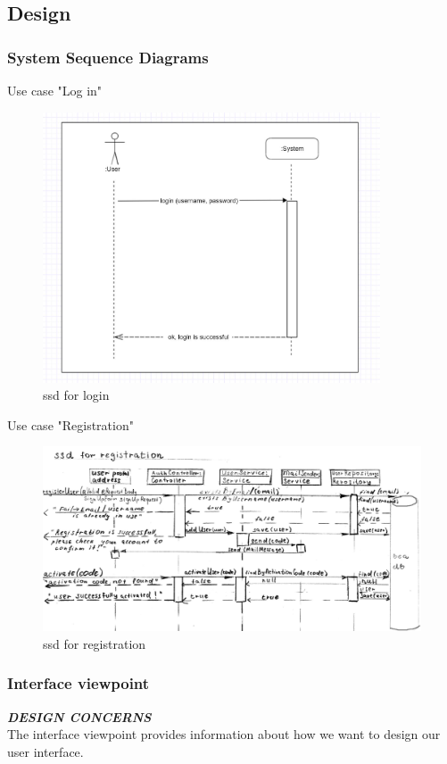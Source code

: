 \documentclass{scrartcl}
\begin{document}
\subsection{Design}
\subsubsection{System Sequence Diagrams}
 Use case "Log in"
\begin{figure}[H]
\centering
\includegraphics[width = 100mm]{ssd-login.JPG}
\caption{ssd for login}
\label{ssd for login}
\end{figure}


Use case "Registration"
\begin{figure}[H]
\centering
\includegraphics[width = 140mm]{ssd-reg.JPG}
\caption{ssd for registration}
\label{ssd for registration}
\end{figure}

\subsubsection{Interface viewpoint}
\textbf{\textit{DESIGN CONCERNS}}
\\
The interface viewpoint provides information about how we want to design our user interface. \\
\end{document}
